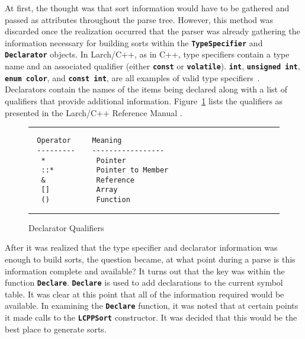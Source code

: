 \documentclass[12pt]{article} %
\newcommand{\reserved}[1]{\textbf{\texttt{#1}}} %
\newcommand{\UNSPACEFORBOX}{\vspace{-2ex}}
\newcommand{\HLINE}{\UNSPACEFORBOX%
\begin{flushleft}\rule{\textwidth}{0.01in}\end{flushleft}%
\UNSPACEFORBOX}
\newenvironment{BFIGURE}{

\begin{figure}
\small
\HLINE
}{
\HLINE
\normalsize
\end{figure}
}
\begin{document}
At first, the thought was that sort information would have to be
gathered and passed as attributes throughout the parse tree. However,
this method was discarded once the realization occurred that the
parser was already gathering the information necessary for building
sorts within the \reserved{TypeSpecifier} and \reserved{Declarator} objects. In Larch/C++,
as in C++, type specifiers contain a type name and an associated
qualifier (either \reserved{const} or \reserved{volatile}). \reserved{int},
\reserved{unsigned int}, \reserved{enum color}, and \reserved{const
int}, are all examples of valid type
specifiers~\cite{Leavens96c}. Declarators contain the names of the
items being declared along with a list of qualifiers that provide
additional information. Figure~\ref{declquals} lists the qualifiers as
presented in the Larch/C++ Reference Manual \cite{Leavens96c}.
\begin{BFIGURE}
\begin{verbatim}
  Operator     Meaning
  ---------    -----------------
   *            Pointer
   ::*          Pointer to Member
   &            Reference
   []           Array
   ()           Function
\end{verbatim}
\caption{Declarator Qualifiers}
\label{declquals}
\end{BFIGURE}


After it was realized that the type specifier and declarator
information was enough to build sorts, the question became, at what
point during a parse is this information complete and available? It
turns out that the key was within the function
\reserved{Declare}. \reserved{Declare} is used to add declarations
to the current symbol table. It was clear at this point that all of
the information required would be available. In examining
the \reserved{Declare} function, it was noted that at certain points
it made calls to the \reserved{LCPPSort} constructor. It was decided that
this would be the best place to generate sorts. 
\end{document}
